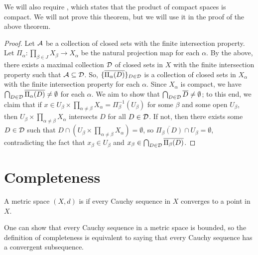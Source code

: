 We will also require , which states that the product of compact spaces is compact. We will not prove this theorem, but we will use it in the proof of the above theorem.

\begin{proof}
    Let $\mathcal{A}$ be a collection of closed sets with the finite intersection property. Let $\Pi_{\alpha} : \prod_{\beta \in J} X_{\beta} \to X_{\alpha}$ be the natural projection map for each $\alpha$. By the above, there exists a maximal collection $\mathcal{D}$ of closed sets in $X$ with the finite intersection property such that $\mathcal{A} \subseteq \mathcal{D}$. So, $\{\overline{\Pi_{\alpha}(D)}\}_{D \in \mathcal{D}}$ is a collection of closed sets in $X_{\alpha}$ with the finite intersection property for each $\alpha$. Since $X_{\alpha}$ is compact, we have $\bigcap_{D \in \mathcal{D}} \overline{\Pi_{\alpha}(D)} \neq \emptyset$ for each $\alpha$. We aim to show that $\bigcap_{D \in \mathcal{D}} \overline{D} \neq \emptyset$; to this end, we claim that if $x \in U_{\beta} \times \prod_{\alpha \neq \beta} X_{\alpha} = \Pi_{\beta}^{-1}(U_{\beta})$ for some $\beta$ and some open $U_{\beta}$, then $U_{\beta} \times \prod_{\alpha \neq \beta} X_{\alpha}$ intersects $D$ for all $D \in \mathcal{D}$. If not, then there exists some $D \in \mathcal{D}$ such that $D \cap (U_{\beta} \times \prod_{\alpha \neq \beta} X_{\alpha}) = \emptyset$, so $\overline{\Pi_{\beta}(D)} \cap U_{\beta} = \emptyset$, contradicting the fact that $x_{\beta} \in U_{\beta}$ and $x_{\beta} \in \bigcap_{D \in \mathcal{D}} \overline{\Pi_{\beta}(D)}$. 
\end{proof}


\section{Completeness}

\begin{definition}
    A metric space $(X,d)$ is  if every Cauchy sequence in $X$ converges to a point in $X$.
\end{definition}

One can show that every Cauchy sequence in a metric space is bounded, so the definition of completeness is equivalent to saying that every Cauchy sequence has a convergent subsequence. 

